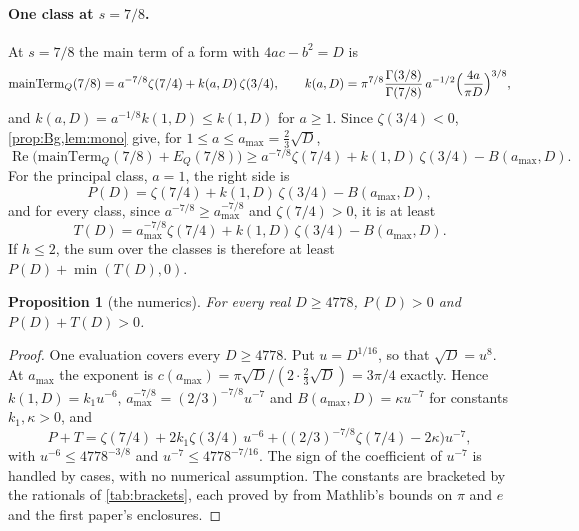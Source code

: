 \documentclass[11pt]{article}
\newtheorem{proposition}[theorem]{Proposition}
\theoremstyle{definition}
\newcommand{\re}{\operatorname{Re}}
\begin{document}
{\paragraph{One class at $s = 7/8$.} At $s = 7/8$ the main term of a form with $4ac - b^2 = D$ is
\[
\mathrm{mainTerm}_Q(7/8) = a^{-7/8}\zeta(7/4) + k(a, D)\,\zeta(3/4), \qquad k(a, D) = \pi^{7/8}\frac{\Gamma(3/8)}{\Gamma(7/8)}\,a^{-1/2}\Bigl(\frac{4a}{\pi D}\Bigr)^{3/8},
\]
and $k(a, D) = a^{-1/8}k(1, D) \le k(1, D)$ for $a \ge 1$. Since $\zeta(3/4) < 0$, \cref{prop:Bg,lem:mono} give, for $1 \le a \le a_{\max} = \frac23\sqrt D$,
\begin{equation}\label{eq:oneclass}
\re\bigl(\mathrm{mainTerm}_Q(7/8) + E_Q(7/8)\bigr) \ge a^{-7/8}\zeta(7/4) + k(1, D)\,\zeta(3/4) - B(a_{\max}, D).
\end{equation}
For the principal class, $a = 1$, the right side is
\[
P(D) = \zeta(7/4) + k(1, D)\,\zeta(3/4) - B(a_{\max}, D),
\]
and for every class, since $a^{-7/8} \ge a_{\max}^{-7/8}$ and $\zeta(7/4) > 0$, it is at least
\[
T(D) = a_{\max}^{-7/8}\zeta(7/4) + k(1, D)\,\zeta(3/4) - B(a_{\max}, D).
\]
If $h \le 2$, the sum over the classes is therefore at least $P(D) + \min(T(D), 0)$.

\begin{proposition}[the numerics]\label{prop:numerics}
For every real $D \ge 4778$, $P(D) > 0$ and $P(D) + T(D) > 0$.
\end{proposition}

\begin{proof}
One evaluation covers every $D \ge 4778$. Put $u = D^{1/16}$, so that $\sqrt D = u^8$. At $a_{\max}$ the exponent is $c(a_{\max}) = \pi\sqrt D/(2\cdot\frac23\sqrt D) = 3\pi/4$ exactly. Hence $k(1, D) = k_1u^{-6}$, $a_{\max}^{-7/8} = (2/3)^{-7/8}u^{-7}$ and $B(a_{\max}, D) = \kappa u^{-7}$ for constants $k_1, \kappa > 0$, and
\[
P + T = \zeta(7/4) + 2k_1\zeta(3/4)\,u^{-6} + \bigl((2/3)^{-7/8}\zeta(7/4) - 2\kappa\bigr)u^{-7},
\]
with $u^{-6} \le 4778^{-3/8}$ and $u^{-7} \le 4778^{-7/16}$. The sign of the coefficient of $u^{-7}$ is handled by cases, with no numerical assumption. The constants are bracketed by the rationals of \cref{tab:brackets}, each proved by  from Mathlib's bounds on $\pi$ and $e$ and the first paper's enclosures.
\end{proof}

}
\end{document}
